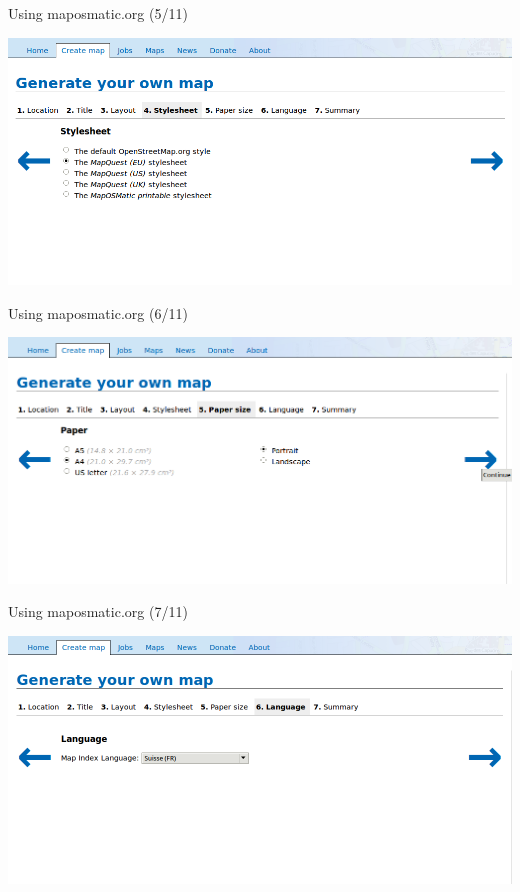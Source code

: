 \documentclass{beamer}
\begin{document}
\begin{frame}{Using maposmatic.org (5/11)}
  \begin{center}
    \includegraphics[width=\textwidth]{screenshot5.png}
  \end{center}
\end{frame}

\begin{frame}{Using maposmatic.org (6/11)}
  \begin{center}
    \includegraphics[width=\textwidth]{screenshot6.png}
  \end{center}
\end{frame}

\begin{frame}{Using maposmatic.org (7/11)}
  \begin{center}
    \includegraphics[width=\textwidth]{screenshot7.png}
  \end{center}
\end{frame}
\end{document}
